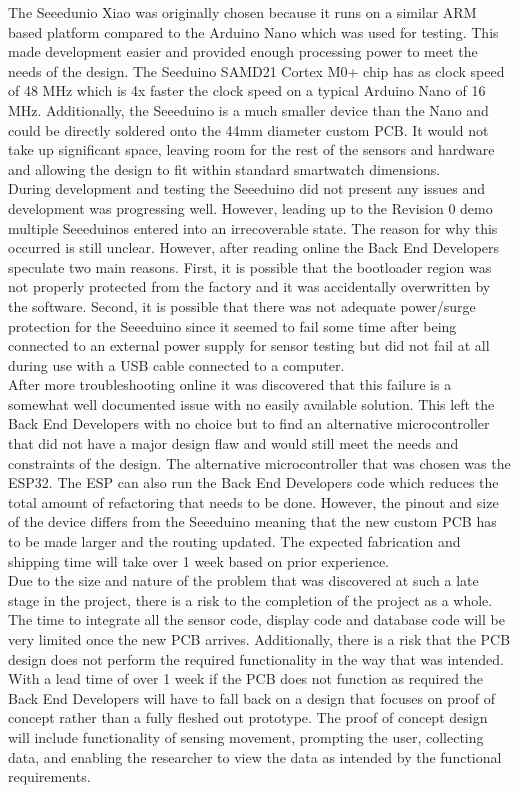 \documentclass[12pt, titlepage]{article}
\begin{document}
The Seeedunio Xiao was originally chosen because it runs on a similar ARM based platform compared to the Arduino Nano which was used for testing. This made development easier and provided enough processing power to meet the needs of the design. The Seeduino SAMD21 Cortex M0+ chip has as clock speed of 48 MHz which is 4x faster the clock speed on a typical Arduino Nano of 16 MHz. Additionally, the Seeeduino is a much smaller device than the Nano and could be directly soldered onto the 44mm diameter custom PCB. It would not take up significant space, leaving room for the rest of the sensors and hardware and allowing the design to fit within standard smartwatch dimensions. \\

During development and testing the Seeeduino did not present any issues and development was progressing well. However, leading up to the Revision 0 demo multiple Seeeduinos entered into an irrecoverable state. The reason for why this occurred is still unclear. However, after reading online the Back End Developers speculate two main reasons. First, it is possible that the bootloader region was not properly protected from the factory and it was accidentally overwritten by the software. Second, it is possible that there was not adequate power/surge protection for the Seeeduino since it seemed to fail some time after being connected to an external power supply for sensor testing but did not fail at all during use with a USB cable connected to a computer. \\

After more troubleshooting online it was discovered that this failure is a somewhat well documented issue with no easily available solution. This left the Back End Developers with no choice but to find an alternative microcontroller that did not have a major design flaw and would still meet the needs and constraints of the design. The alternative microcontroller that was chosen was the ESP32. The ESP can also run the Back End Developers code which reduces the total amount of refactoring that needs to be done. However, the pinout and size of the device differs from the Seeeduino meaning that the new custom PCB has to be made larger and the routing updated. The expected fabrication and shipping time will take over 1 week based on prior experience. \\

Due to the size and nature of the problem that was discovered at such a late stage in the project, there is a risk to the completion of the project as a whole. The time to integrate all the sensor code, display code and database code will be very limited once the new PCB arrives. Additionally, there is a risk that the PCB design does not perform the required functionality in the way that was intended. With a lead time of over 1 week if the PCB does not function as required the Back End Developers will have to fall back on a design that focuses on proof of concept rather than a fully fleshed out prototype. The proof of concept design will include functionality of sensing movement, prompting the user, collecting data, and enabling the researcher to view the data as intended by the functional requirements. \\
\end{document}
